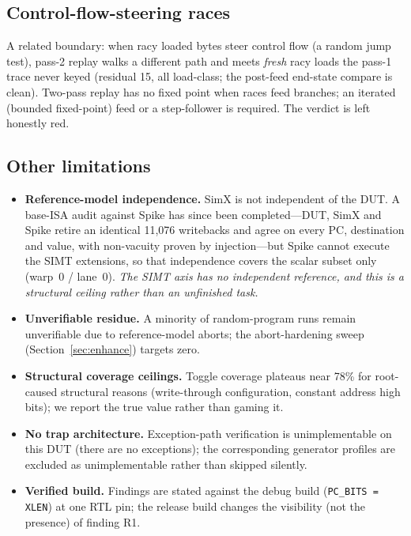 \documentclass[conference]{IEEEtran}
\newcommand{\code}[1]{\texttt{\small #1}}
\begin{document}
\subsection{Control-flow-steering races}
A related boundary: when racy loaded bytes steer control flow (a random
jump test), pass-2 replay walks a different path and meets \emph{fresh}
racy loads the pass-1 trace never keyed (residual 15, all load-class;
the post-feed end-state compare is clean). Two-pass replay has no fixed
point when races feed branches; an iterated (bounded fixed-point) feed
or a step-follower is required. The verdict is left honestly red.

\subsection{Other limitations}
\begin{itemize}
\item \textbf{Reference-model independence.} SimX is not independent of
the DUT. A base-ISA audit against Spike has since been completed---DUT,
SimX and Spike retire an identical 11{,}076 writebacks and agree on every
PC, destination and value, with non-vacuity proven by injection---but
Spike cannot execute the SIMT extensions, so that independence covers the
scalar subset only (warp~0 / lane~0). \emph{The SIMT axis has no
independent reference, and this is a structural ceiling rather than an
unfinished task.}
\item \textbf{Unverifiable residue.} A minority of random-program runs
remain unverifiable due to reference-model aborts; the abort-hardening
sweep (Section~\ref{sec:enhance}) targets zero.
\item \textbf{Structural coverage ceilings.} Toggle coverage plateaus
near 78\% for root-caused structural reasons (write-through
configuration, constant address high bits); we report the true value
rather than gaming it.
\item \textbf{No trap architecture.} Exception-path verification is
unimplementable on this DUT (there are no exceptions); the
corresponding generator profiles are excluded as unimplementable
rather than skipped silently.
\item \textbf{Verified build.} Findings are stated against the debug
build (\code{PC\_BITS = XLEN}) at one RTL pin; the release build
changes the visibility (not the presence) of finding R1.
\end{itemize}

\end{document}
